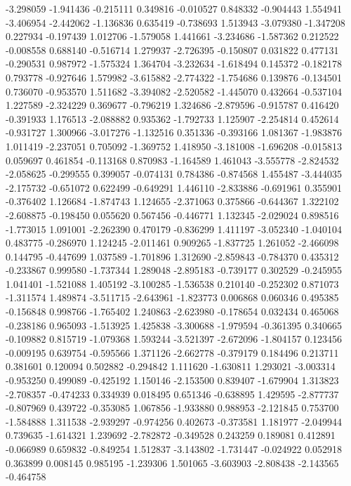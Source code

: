 -3.298059
-1.941436
-0.215111
0.349816
-0.010527
0.848332
-0.904443
1.554941
-3.406954
-2.442062
-1.136836
0.635419
-0.738693
1.513943
-3.079380
-1.347208
0.227934
-0.197439
1.012706
-1.579058
1.441661
-3.234686
-1.587362
0.212522
-0.008558
0.688140
-0.516714
1.279937
-2.726395
-0.150807
0.031822
0.477131
-0.290531
0.987972
-1.575324
1.364704
-3.232634
-1.618494
0.145372
-0.182178
0.793778
-0.927646
1.579982
-3.615882
-2.774322
-1.754686
0.139876
-0.134501
0.736070
-0.953570
1.511682
-3.394082
-2.520582
-1.445070
0.432664
-0.537104
1.227589
-2.324229
0.369677
-0.796219
1.324686
-2.879596
-0.915787
0.416420
-0.391933
1.176513
-2.088882
0.935362
-1.792733
1.125907
-2.254814
0.452614
-0.931727
1.300966
-3.017276
-1.132516
0.351336
-0.393166
1.081367
-1.983876
1.011419
-2.237051
0.705092
-1.369752
1.418950
-3.181008
-1.696208
-0.015813
0.059697
0.461854
-0.113168
0.870983
-1.164589
1.461043
-3.555778
-2.824532
-2.058625
-0.299555
0.399057
-0.074131
0.784386
-0.874568
1.455487
-3.444035
-2.175732
-0.651072
0.622499
-0.649291
1.446110
-2.833886
-0.691961
0.355901
-0.376402
1.126684
-1.874743
1.124655
-2.371063
0.375866
-0.644367
1.322102
-2.608875
-0.198450
0.055620
0.567456
-0.446771
1.132345
-2.029024
0.898516
-1.773015
1.091001
-2.262390
0.470179
-0.836299
1.411197
-3.052340
-1.040104
0.483775
-0.286970
1.124245
-2.011461
0.909265
-1.837725
1.261052
-2.466098
0.144795
-0.447699
1.037589
-1.701896
1.312690
-2.859843
-0.784370
0.435312
-0.233867
0.999580
-1.737344
1.289048
-2.895183
-0.739177
0.302529
-0.245955
1.041401
-1.521088
1.405192
-3.100285
-1.536538
0.210140
-0.252302
0.871073
-1.311574
1.489874
-3.511715
-2.643961
-1.823773
0.006868
0.060346
0.495385
-0.156848
0.998766
-1.765402
1.240863
-2.623980
-0.178654
0.032434
0.465068
-0.238186
0.965093
-1.513925
1.425838
-3.300688
-1.979594
-0.361395
0.340665
-0.109882
0.815719
-1.079368
1.593244
-3.521397
-2.672096
-1.804157
0.123456
-0.009195
0.639754
-0.595566
1.371126
-2.662778
-0.379179
0.184496
0.213711
0.381601
0.120094
0.502882
-0.294842
1.111620
-1.630811
1.293021
-3.003314
-0.953250
0.499089
-0.425192
1.150146
-2.153500
0.839407
-1.679904
1.313823
-2.708357
-0.474233
0.334939
0.018495
0.651346
-0.638895
1.429595
-2.877737
-0.807969
0.439722
-0.353085
1.067856
-1.933880
0.988953
-2.121845
0.753700
-1.584888
1.311538
-2.939297
-0.974256
0.402673
-0.373581
1.181977
-2.049944
0.739635
-1.614321
1.239692
-2.782872
-0.349528
0.243259
0.189081
0.412891
-0.066989
0.659832
-0.849254
1.512837
-3.143802
-1.731447
-0.024922
0.052918
0.363899
0.008145
0.985195
-1.239306
1.501065
-3.603903
-2.808438
-2.143565
-0.464758
